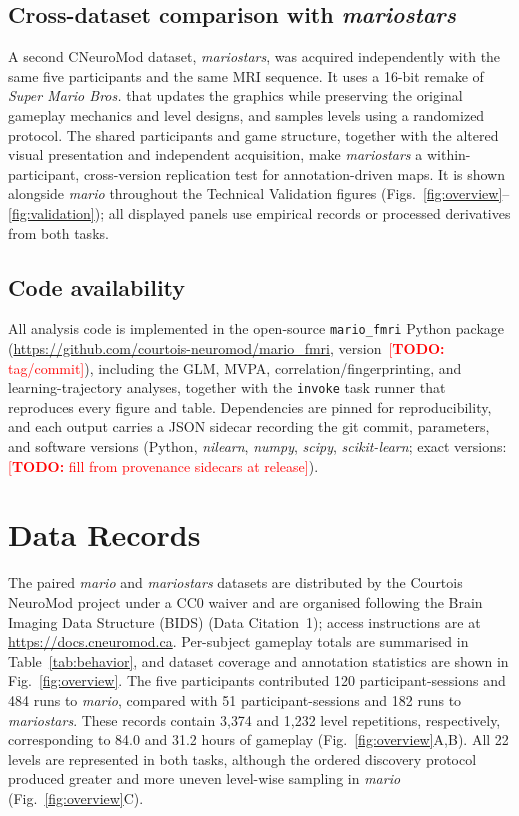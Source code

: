 \documentclass{article}
\newcommand{\TODO}[1]{\textcolor{red}{[\textbf{TODO:} #1]}}
\begin{document}
\subsection*{Cross-dataset comparison with \textit{mariostars}}
A second CNeuroMod dataset, \textit{mariostars}, was acquired independently with the same five
participants and the same MRI sequence. It uses a 16-bit remake of \textit{Super Mario Bros.}
that updates the graphics while preserving the original gameplay mechanics and level designs,
and samples levels using a randomized protocol. The shared participants and game structure,
together with the altered visual presentation and independent acquisition, make
\textit{mariostars} a within-participant, cross-version replication test for annotation-driven
maps. It is shown alongside \textit{mario} throughout the Technical Validation figures
(Figs.~\ref{fig:overview}--\ref{fig:validation}); all displayed panels use empirical records or
processed derivatives from both tasks.

\subsection*{Code availability}
All analysis code is implemented in the open-source \texttt{mario\_fmri} Python package
(\url{https://github.com/courtois-neuromod/mario_fmri}, version~\TODO{tag/commit}), including the
GLM, MVPA, correlation/fingerprinting, and learning-trajectory analyses, together with the
\texttt{invoke} task runner that reproduces every figure and table. Dependencies are pinned for
reproducibility, and each output carries a JSON sidecar recording the git commit, parameters, and
software versions (Python, \textit{nilearn}, \textit{numpy}, \textit{scipy},
\textit{scikit-learn}; exact versions: \TODO{fill from provenance sidecars at release}).


\section*{Data Records}
\label{sec:datarecords}

The paired \textit{mario} and \textit{mariostars} datasets are distributed by the Courtois
NeuroMod project under a CC0 waiver and are organised following the Brain Imaging Data Structure
(BIDS)\cite{gorgolewski2016bids}
(Data Citation~1); access instructions are at \url{https://docs.cneuromod.ca}. Per-subject
gameplay totals are summarised in Table~\ref{tab:behavior}, and dataset coverage and annotation
statistics are shown in Fig.~\ref{fig:overview}. The five participants contributed 120
participant-sessions and 484 runs to \textit{mario}, compared with 51 participant-sessions and 182
runs to \textit{mariostars}. These records contain 3{,}374 and 1{,}232 level repetitions,
respectively, corresponding to 84.0 and 31.2 hours of gameplay (Fig.~\ref{fig:overview}A,B). All 22
levels are represented in both tasks, although the ordered discovery protocol produced greater
and more uneven level-wise sampling in \textit{mario} (Fig.~\ref{fig:overview}C).
\end{document}
